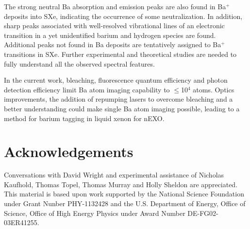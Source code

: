\documentclass[aps,pra,reprint,superscriptaddress]{revtex4-1}
\begin{document}
The strong neutral Ba absorption and emission peaks are also found in Ba$^+$ deposits into SXe, indicating the occurrence of some neutralization.
In addition, sharp peaks associated with well-resolved vibrational lines of an electronic transition in a yet unidentified barium and hydrogen species are found.
Additional peaks not found in Ba deposits are tentatively assigned to Ba$^+$ transitions in SXe.  
Further experimental and theoretical studies are needed to fully understand all the observed spectral features.

In the current work, bleaching, fluorescence quantum efficiency and photon detection efficiency limit Ba atom imaging capability to $\le$10$^4$ atoms.
Optics improvements, the addition of repumping lasers to overcome bleaching and a better understanding could make single Ba atom imaging possible, leading to a method for barium tagging in liquid xenon for nEXO.


\section*{Acknowledgements}

Conversations with David Wright and experimental assistance of Nicholas Kaufhold, Thomas Topel, Thomas Murray and Holly Sheldon are appreciated.  This material is based upon work supported by the National Science Foundation under Grant Nunber PHY-1132428 and the U.S. Department of Energy, Office of Science, Office of High Energy Physics under Award Number DE-FG02-03ER41255.
\end{document}
